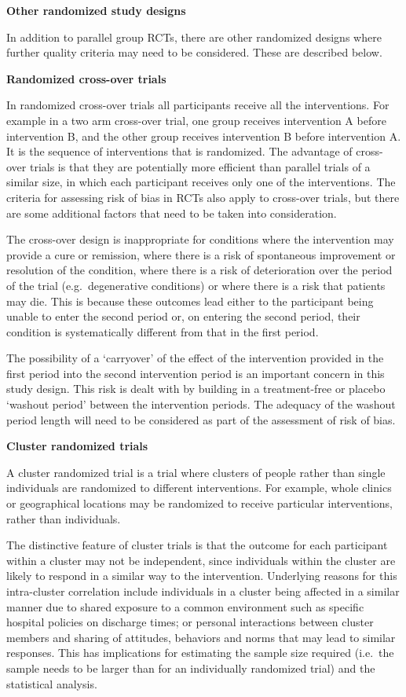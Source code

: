 \documentclass[
  11pt,
  a4paper,
  DIV=11,
  numbers=noendperiod]{scrreprt}
\begin{document}
\textbf{Other randomized study designs}

In addition to parallel group RCTs, there are other randomized designs
where further quality criteria may need to be considered. These are
described below.

\textbf{Randomized cross-over trials}

In randomized cross-over trials all participants receive all the
interventions. For example in a two arm cross-over trial, one group
receives intervention A before intervention B, and the other group
receives intervention B before intervention A. It is the sequence of
interventions that is randomized. The advantage of cross-over trials is
that they are potentially more efficient than parallel trials of a
similar size, in which each participant receives only one of the
interventions. The criteria for assessing risk of bias in RCTs also
apply to cross-over trials, but there are some additional factors that
need to be taken into consideration.

The cross-over design is inappropriate for conditions where the
intervention may provide a cure or remission, where there is a risk of
spontaneous improvement or resolution of the condition, where there is a
risk of deterioration over the period of the trial (e.g.~degenerative
conditions) or where there is a risk that patients may die. This is
because these outcomes lead either to the participant being unable to
enter the second period or, on entering the second period, their
condition is systematically different from that in the first period.

The possibility of a `carryover' of the effect of the intervention
provided in the first period into the second intervention period is an
important concern in this study design. This risk is dealt with by
building in a treatment-free or placebo `washout period' between the
intervention periods. The adequacy of the washout period length will
need to be considered as part of the assessment of risk of bias.

\textbf{Cluster randomized trials}

A cluster randomized trial is a trial where clusters of people rather
than single individuals are randomized to different interventions. For
example, whole clinics or geographical locations may be randomized to
receive particular interventions, rather than individuals.

The distinctive feature of cluster trials is that the outcome for each
participant within a cluster may not be independent, since individuals
within the cluster are likely to respond in a similar way to the
intervention. Underlying reasons for this intra-cluster correlation
include individuals in a cluster being affected in a similar manner due
to shared exposure to a common environment such as specific hospital
policies on discharge times; or personal interactions between cluster
members and sharing of attitudes, behaviors and norms that may lead to
similar responses. This has implications for estimating the sample size
required (i.e.~the sample needs to be larger than for an individually
randomized trial) and the statistical analysis.
\end{document}
